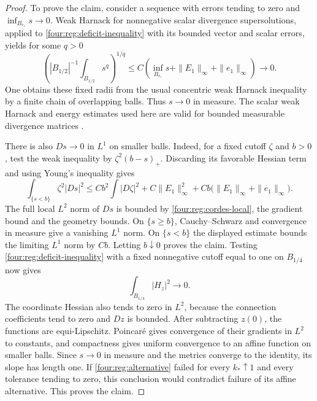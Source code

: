 \begin{proof}
To prove the claim, consider a sequence with errors tending to zero
and $\inf_{B_{r_*}}s\to0$.  Weak Harnack for nonnegative scalar
divergence supersolutions, applied to
\eqref{four:reg:deficit-inequality} with its bounded vector and scalar
errors, yields for some $q>0$
\[
 \left(|B_{1/2}|^{-1}\int_{B_{1/2}}s^q\right)^{1/q}
 \le C\left(\inf_{B_{r_*}}s+\|E_1\|_\infty+\|e_1\|_\infty\right)
       \longrightarrow0.
\]
One obtains these fixed radii from the usual concentric weak Harnack
inequality by a finite chain of overlapping balls.  Thus $s\to0$
in measure.  The scalar weak Harnack and energy estimates used here
are valid for bounded measurable divergence matrices \cite{GilbargTrudinger2001}.

There is also $Ds\to0$ in $L^1$ on smaller balls.  Indeed, for a
fixed cutoff $\zeta$ and $b>0$, test the weak inequality by
$\zeta^2(b-s)_+$.  Discarding its favorable Hessian term and using
Young's inequality gives
\[
 \int_{\{s<b\}}\zeta^2|Ds|^2
 \le Cb^2\int|D\zeta|^2+C\|E_1\|_\infty^2
             +Cb\bigl(\|E_1\|_\infty+\|e_1\|_\infty\bigr).
\]
The full local $L^2$ norm of $Ds$ is bounded by
\eqref{four:reg:cordes-local}, the gradient bound and the geometry bounds.
On $\{s\ge b\}$, Cauchy--Schwarz and convergence in measure give
a vanishing $L^1$ norm.  On $\{s<b\}$ the displayed estimate bounds
the limiting $L^1$ norm by $Cb$.  Letting $b\downarrow0$ proves the
claim.  Testing \eqref{four:reg:deficit-inequality} with a fixed
nonnegative cutoff equal to one on $B_{1/4}$ now gives
\[
 \int_{B_{1/4}}|H_z|^2\longrightarrow0.
\]
The coordinate Hessian also tends to zero in $L^2$, because the
connection coefficients tend to zero and $Dz$ is bounded.
After subtracting $z(0)$, the functions are equi-Lipschitz.
Poincar\'e gives convergence of their gradients in $L^2$ to constants,
and compactness gives uniform convergence to an affine function on
smaller balls.  Since $s\to0$ in measure and the metrics converge to
the identity, its slope has length one.  If
\eqref{four:reg:alternative} failed for every $k_*\uparrow1$ and every
tolerance tending to zero, this conclusion would contradict failure
of its affine alternative.  This proves the claim.


\end{proof}
